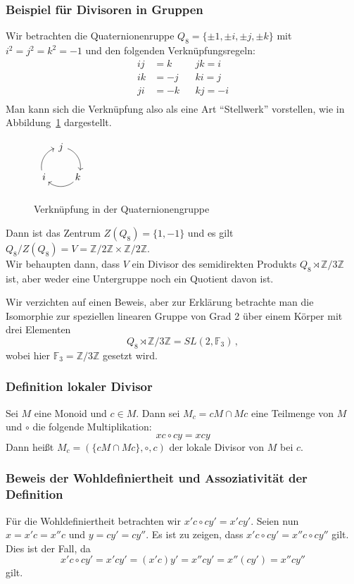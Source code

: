 \documentclass[12pt, german]{article}
\newcommand{\Z}{\mathbb{Z}}
\begin{document}
	\subsubsection{Beispiel für Divisoren in Gruppen}
	Wir betrachten die Quaternionenruppe $Q_8 =  \{\pm1, \pm i ,\pm j, \pm k\}$ mit $i^2 = j^2 = k^2 = -1$ und den folgenden Verknüpfungsregeln:
	\begin{align*}
		ij &= k && jk = i  \\ 
		ik&=-j 	&& ki = j \\
		ji&= -k && kj = -i \\
	\end{align*}
	Man kann sich die Verknüpfung also als eine Art ``Stellwerk'' vorstellen, wie in Abbildung~\ref{fig:quaternion} dargestellt.
	\begin{figure}[h!]
		\centering
		$ \begin{array}{ccc}
			\begin{tikzpicture}[->,scale=.7] 
				\foreach \a/\t in {90/j,-30/k,210/i}{
					\node (\t) at (\a:1cm) {$\t$};
					\draw (\a-20:1cm)  arc (\a-20:\a-100:1cm);
				} 
			\end{tikzpicture}
		\end{array}$
		\caption{Verknüpfung in der Quaternionengruppe}
		\label{fig:quaternion}
	\end{figure}
	
	Dann ist das Zentrum $Z(Q_8) = \{1, -1\}$ und es gilt $Q_8/Z(Q_8) = V = \Z/2\Z \times\Z/2\Z$.\\
	Wir behaupten dann, dass $V$ ein Divisor des semidirekten Produkts $Q_8  \rtimes \Z / 3\Z$ ist, aber weder eine Untergruppe noch ein Quotient davon ist.
	
	Wir verzichten auf einen Beweis, aber zur Erklärung betrachte man die Isomorphie zur speziellen linearen Gruppe von Grad 2 über einem Körper mit drei Elementen $$Q_8  \rtimes \Z / 3\Z = SL(2, \mathbb{F}_3)\, ,$$ 
	wobei hier $\mathbb{F}_3 = \Z / 3\Z$ gesetzt wird.
	
	\subsubsection{Definition lokaler Divisor}
	Sei $M$ eine Monoid und $c \in M$. Dann sei $M_c = cM \cap Mc$ eine Teilmenge von $M$ und $\circ$ die folgende Multiplikation: $$xc \circ cy = xcy$$
	Dann hei\ss t $M_c = (\{cM \cap Mc\}, \circ, c)$ der lokale Divisor von $M$ bei $c$.
	
	\subsubsection{Beweis der Wohldefiniertheit und Assoziativität der Definition}
	Für die Wohldefiniertheit betrachten wir $x'c \circ cy' = x'cy'$.
	Seien nun $x = x'c = x''c$ und $y = cy' = cy''$. Es ist zu zeigen, dass $x'c \circ cy' = x''c \circ cy''$ gilt. Dies ist der Fall, da $$x'c \circ cy' = x'cy' = (x'c)y' = x''cy' = x''(cy')= x''cy''$$ gilt. 
	
\end{document}
